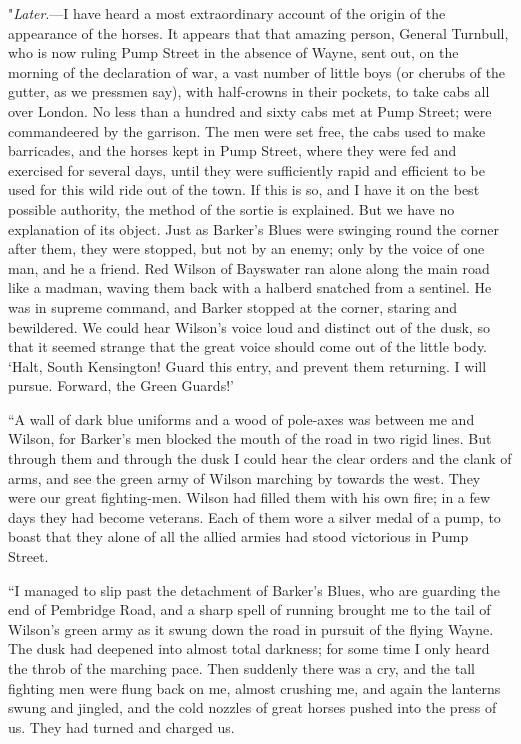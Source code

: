 \documentclass{book}
\begin{document}
"\emph{Later}.—I have heard a most extraordinary account of the origin of the appearance of the horses. It appears that that amazing person, General Turnbull, who is now ruling Pump Street in the absence of Wayne, sent out, on the morning of the declaration of war, a vast number of little boys (or cherubs of the gutter, as we pressmen say), with half-crowns in their pockets, to take cabs all over London. No less than a hundred and sixty cabs met at Pump Street; were commandeered by the garrison. The men were set free, the cabs used to make barricades, and the horses kept in Pump Street, where they were fed and exercised for several days, until they were sufficiently rapid and efficient to be used for this wild ride out of the town. If this is so, and I have it on the best possible authority, the method of the sortie is explained. But we have no explanation of its object. Just as Barker’s Blues were swinging round the corner after them, they were stopped, but not by an enemy; only by the voice of one man, and he a friend. Red Wilson of Bayswater ran alone along the main road like a madman, waving them back with a halberd snatched from a sentinel. He was in supreme command, and Barker stopped at the corner, staring and bewildered. We could hear Wilson’s voice loud and distinct out of the dusk, so that it seemed strange that the great voice should come out of the little body. ‘Halt, South Kensington! Guard this entry, and prevent them returning. I will pursue. Forward, the Green Guards!’

“A wall of dark blue uniforms and a wood of pole-axes was between me and Wilson, for Barker’s men blocked the mouth of the road in two rigid lines. But through them and through the dusk I could hear the clear orders and the clank of arms, and see the green army of Wilson marching by towards the west. They were our great fighting-men. Wilson had filled them with his own fire; in a few days they had become veterans. Each of them wore a silver medal of a pump, to boast that they alone of all the allied armies had stood victorious in Pump Street.

“I managed to slip past the detachment of Barker’s Blues, who are guarding the end of Pembridge Road, and a sharp spell of running brought me to the tail of Wilson’s green army as it swung down the road in pursuit of the flying Wayne. The dusk had deepened into almost total darkness; for some time I only heard the throb of the marching pace. Then suddenly there was a cry, and the tall fighting men were flung back on me, almost crushing me, and again the lanterns swung and jingled, and the cold nozzles of great horses pushed into the press of us. They had turned and charged us.
\end{document}
